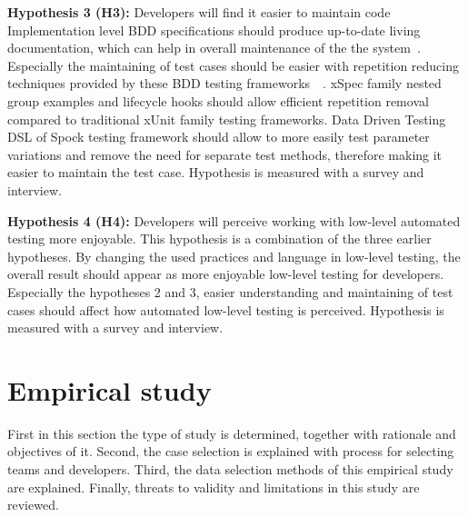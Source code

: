     \begin{addmargin}[0em]{0em}
    \vspace{10px}
    \textbf{Hypothesis 3 (H3):} Developers will find it easier to maintain code
    \vspace{5px}
    \newline
    Implementation level BDD specifications should produce up-to-date living documentation, which can help in overall
    maintenance of the the system~\cite{smart2014bdd}. Especially the maintaining of test cases should be easier
    with repetition reducing techniques provided by these BDD testing frameworks~\cite{chelimsky2010rspec}~\cite{kapelonis2016java}.
    xSpec family nested group examples and lifecycle hooks should allow efficient repetition removal compared to traditional xUnit family testing frameworks.
    Data Driven Testing DSL of Spock testing framework should allow to more easily test parameter variations and remove
    the need for separate test methods, therefore making it easier to maintain the test case.
    Hypothesis is measured with a survey and interview.
    \end{addmargin}

    \begin{addmargin}[0em]{0em}
    \vspace{10px}
    \textbf{Hypothesis 4 (H4):} Developers will perceive working with low-level automated testing more enjoyable.
    \vspace{5px}
    \newline
    This hypothesis is a combination of the three earlier hypotheses. By changing the used practices and language in low-level testing,
    the overall result should appear as more enjoyable low-level testing for developers. Especially the hypotheses 2 and 3, easier understanding
    and maintaining of test cases should affect how automated low-level testing is perceived.
    Hypothesis is measured with a survey and interview.
    \end{addmargin}

\section{Empirical study}
First in this section the type of study is determined, together with rationale and objectives of it. Second, the case selection
is explained with process for selecting teams and developers. Third, the data selection methods of this empirical study are
explained. Finally, threats to validity and limitations in this study are reviewed.

